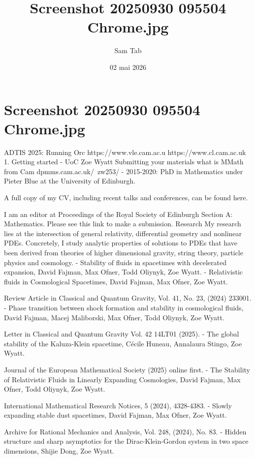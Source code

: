 \documentclass[12pt,a4paper]{article}
\title{Screenshot 20250930 095504 Chrome.jpg}
\author{Sam Tab}
\date{02 mai 2026}
\begin{document}
\maketitle

\section*{Screenshot 20250930 095504 Chrome.jpg}
ADTIS 2025: Running Orc
https://www.vle.cam.ac.u
https://www.cl.cam.ac.uk
1. Getting started - UoC
Zoe Wyatt
Submitting your materials
what is MMath from Cam
dpmms.cam.ac.uk/~zw253/
- 2015-2020: PhD in Mathematics under Pieter Blue at the University of Edinburgh.

A full copy of my CV, including recent talks and conferences, can be found here.

I am an editor at Proceedings of the Royal Society of Edinburgh Section A: Mathematics. Please see this link to make a submission.
Research
My research lies at the intersection of general relativity, differential geometry and nonlinear PDEs. Concretely, I study analytic properties of solutions to PDEs that have been derived from theories of higher dimensional gravity, string theory, particle physics and cosmology.
- Stability of fluids in spacetimes with decelerated expansion, David Fajman, Max Ofner, Todd Oliynyk, Zoe Wyatt.
- Relativistic fluids in Cosmological Spacetimes, David Fajman, Max Ofner, Zoe Wyatt.

Review Article in Classical and Quantum Gravity, Vol. 41, No. 23, (2024) 233001.
- Phase transition between shock formation and stability in cosmological fluids, David Fajman, Macej Maliborski, Max Ofner, Todd Oliynyk, Zoe Wyatt.

Letter in Classical and Quantum Gravity Vol. 42 14LT01 (2025).
- The global stability of the Kaluza-Klein spacetime, Cécile Huneau, Annalaura Stingo, Zoe Wyatt.

Journal of the European Mathematical Society (2025) online first.
- The Stability of Relativistic Fluids in Linearly Expanding Cosmologies, David Fajman, Max Ofner, Todd Oliynyk, Zoe Wyatt.

International Mathematical Research Notices, 5 (2024), 4328-4383.
- Slowly expanding stable dust spacetimes, David Fajman, Max Ofner, Zoe Wyatt.

Archive for Rational Mechanics and Analysis, Vol. 248, (2024), No. 83.
- Hidden structure and sharp asymptotics for the Dirac-Klein-Gordon system in two space dimensions, Shijie Dong, Zoe Wyatt.
\end{document}
